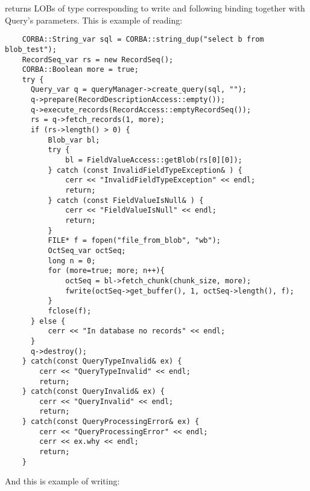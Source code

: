 \documentclass[10pt]{article}
\begin{document}
 returns LOBs of type corresponding to write and following binding
 together with Query's parameters.
 This is example of reading:
\begin{verbatim}
    CORBA::String_var sql = CORBA::string_dup("select b from blob_test");
    RecordSeq_var rs = new RecordSeq();
    CORBA::Boolean more = true;
    try {
      Query_var q = queryManager->create_query(sql, "");
      q->prepare(RecordDescriptionAccess::empty());
      q->execute_records(RecordAccess::emptyRecordSeq());
      rs = q->fetch_records(1, more);
      if (rs->length() > 0) {
          Blob_var bl;
          try {
              bl = FieldValueAccess::getBlob(rs[0][0]);
          } catch (const InvalidFieldTypeException& ) {
              cerr << "InvalidFieldTypeException" << endl;
              return;
          } catch (const FieldValueIsNull& ) {
              cerr << "FieldValueIsNull" << endl;
              return;
          }
          FILE* f = fopen("file_from_blob", "wb");
          OctSeq_var octSeq;
          long n = 0;
          for (more=true; more; n++){
              octSeq = bl->fetch_chunk(chunk_size, more);
              fwrite(octSeq->get_buffer(), 1, octSeq->length(), f);
          }
          fclose(f);
      } else {
          cerr << "In database no records" << endl;
      }
      q->destroy();
    } catch(const QueryTypeInvalid& ex) {
        cerr << "QueryTypeInvalid" << endl;
        return;
    } catch(const QueryInvalid& ex) {
        cerr << "QueryInvalid" << endl;
        return;
    } catch(const QueryProcessingError& ex) {
        cerr << "QueryProcessingError" << endl;
        cerr << ex.why << endl;
        return;
    }
\end{verbatim}
 And this is example of writing:
\end{document}

